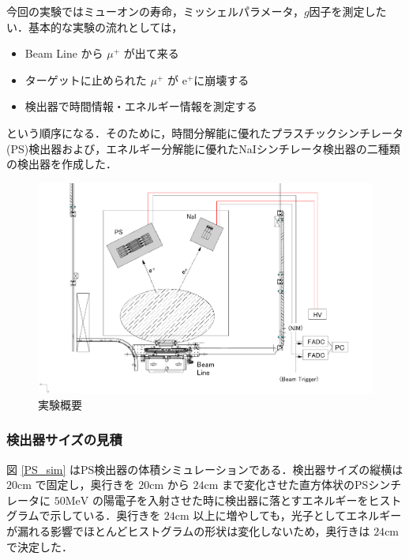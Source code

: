 今回の実験ではミューオンの寿命，ミッシェルパラメータ，$g$因子を測定したい．基本的な実験の流れとしては，
       \begin{itemize}
        \item Beam Line から $\mu ^+$ が出て来る
        \item ターゲットに止められた $\mu ^+$ が e$^+$に崩壊する
        \item 検出器で時間情報・エネルギー情報を測定する
        \end{itemize}
という順序になる．そのために，時間分解能に優れたプラスチックシンチレータ(PS)検出器および，エネルギー分解能に優れたNaIシンチレータ検出器の二種類の検出器を作成した．
       
    \begin{figure}[H]
      \centering
      \includegraphics[width=1\textwidth]{figure/hayakawa/lifetime.png}
      \caption{実験概要}
  \end{figure}

  \subsubsection{検出器サイズの見積}

図 \ref{PS_sim} はPS検出器の体積シミュレーションである．検出器サイズの縦横は $20 \mathrm{cm}$ で固定し，奥行きを $20 \mathrm{cm}$ から $24 \mathrm{cm}$ まで変化させた直方体状のPSシンチレータに $50 \mathrm{MeV}$ の陽電子を入射させた時に検出器に落とすエネルギーをヒストグラムで示している．奥行きを $24 \mathrm{cm}$ 以上に増やしても，光子としてエネルギーが漏れる影響でほとんどヒストグラムの形状は変化しないため，奥行きは $24 \mathrm{cm}$ で決定した．

